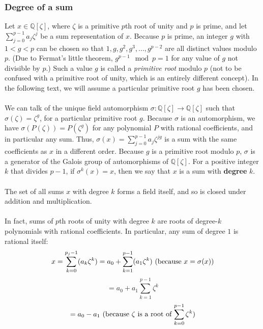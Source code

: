 \documentclass{article}
\begin{document}
        \subsubsection{Degree of a sum}
            Let $ x \in \mathbb{Q}[\zeta] $, where $ \zeta $ is a primitive $ p $th root of unity and $ p $ is prime, and let $ \sum_{j = 0}^{p - 1} a_j \zeta^j $ be a sum representation of $ x $. Because $ p $ is prime, an integer $ g $ with $ 1 < g < p $ can be chosen so that $ 1, g, g^2, g^3, ..., g^{p - 2} $ are all distinct values modulo $ p $. (Due to Fermat's little theorem, $ g^{p - 1} \mod p = 1 $ for any value of $ g $ not divisible by $ p $.) Such a value $ g $ is called a \textit{primitive root} modulo $ p $ (not to be confused with a primitive root of unity, which is an entirely different concept). In the following text, we will assume a particular primitive root $ g $ has been chosen.\\
            \\
            We can talk of the unique field automorphism $ \sigma: \mathbb{Q}[\zeta] \rightarrow \mathbb{Q}[\zeta] $ such that $ \sigma(\zeta) = \zeta^g $, for a particular primitive root $ g $. Because $ \sigma $ is an automorphism, we have $ \sigma(P(\zeta)) = P(\zeta^g) $ for any polynomial $ P $ with rational coefficients, and in particular any sum. Thus, $ \sigma(x) = \sum_{j = 0}^{p - 1} a_j \zeta^{j g} $ is a sum with the same coefficients as $ x $ in a different order. Because $ g $ is a primitive root modulo $ p $, $ \sigma $ is a generator of the Galois group of automorphisms of $ \mathbb{Q}[\zeta] $. For a positive integer $ k $ that divides $ p - 1 $, if $ \sigma^k(x) = x $, then we say that $ x $ is a sum with \textbf{degree} $ k $.\\
            \\
            The set of all sums $ x $ with degree $ k $ forms a field itself, and so is closed under addition and multiplication.\\
            \\
            In fact, sums of $ p $th roots of unity with degree $ k $ are roots of degree-$ k $ polynomials with rational coefficients. In particular, any sum of degree $ 1 $ is rational itself:
            $$ x = \sum_{k = 0}^{p_j - 1} (a_k \zeta^k) = a_0 + \sum_{k = 1}^{p - 1} (a_1 \zeta^k) \text{ (because $ x = \sigma(x) $)} $$
            $$ = a_0 + a_1 \sum_{k = 1}^{p - 1} \zeta^k $$
            $$ = a_0 - a_1 \text{ (because $ \zeta $ is a root of $ \sum_{k = 0}^{p - 1} \zeta^k $)} $$
\end{document}
